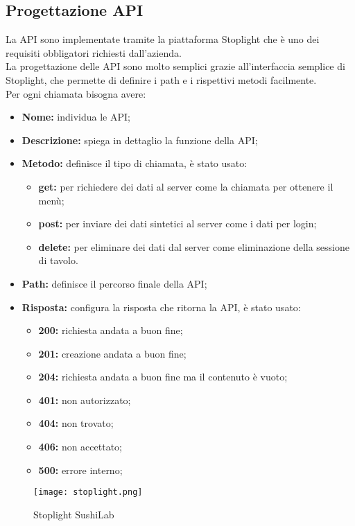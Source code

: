 \subsection{Progettazione API}
La API sono implementate tramite la piattaforma Stoplight che è uno dei requisiti obbligatori richiesti dall'azienda.\\
La progettazione delle API sono molto semplici grazie all'interfaccia semplice di Stoplight, che permette di definire i path e i rispettivi metodi facilmente.\\
Per ogni chiamata bisogna avere:
\begin{itemize}
    \item \textbf{Nome:} individua le API;
    \item \textbf{Descrizione:} spiega in dettaglio la funzione della API;
    \item \textbf{Metodo:} definisce il tipo di chiamata, è stato usato:
    \begin{itemize}
        \item  \textbf{get:} per richiedere dei dati al server come la chiamata per ottenere il menù;
        \item  \textbf{post:} per inviare dei dati sintetici al server come i dati per login;
        \item  \textbf{delete:} per eliminare dei dati dal server come eliminazione della sessione di tavolo.       
    \end{itemize}
    \item \textbf{Path:} definisce il percorso finale della API;
    \item \textbf{Risposta:} configura la risposta che ritorna la API, è stato usato:
    \begin{itemize}
        \item  \textbf{200:} richiesta andata a buon fine;
        \item  \textbf{201:} creazione andata a buon fine;
        \item  \textbf{204:} richiesta andata a buon fine ma il contenuto è vuoto;
        \item  \textbf{401:} non autorizzato;
        \item  \textbf{404:} non trovato;
        \item  \textbf{406:} non accettato;
        \item  \textbf{500:} errore interno;
    \end{itemize}
\end{itemize}
\begin{figure}[H]
    \centering
    \texttt{[image: stoplight.png]}
    \caption{Stoplight SushiLab}
\end{figure}
